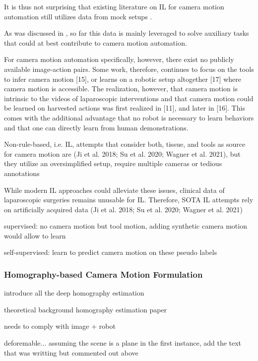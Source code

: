 It is thus not surprising that existing literature on IL for camera motion automation still utilizes data from mock setups \cite{ji2018learning,wagner2021learning}.

As was discussed in , so far this data is mainly leveraged to solve auxiliary tasks that could at best contribute to camera motion automation. 

For camera motion automation specifically, however, there exist no publicly available
image-action pairs. Some work, therefore, continues to focus on the tools to infer
camera motion [15], or learns on a robotic setup altogether [17] where camera
motion is accessible. The realization, however, that camera motion is intrinsic to
the videos of laparoscopic interventions and that camera motion could be learned
on harvested actions was first realized in [11], and later in [16]. This comes with
the additional advantage that no robot is necessary to learn behaviors and that
one can directly learn from human demonstrations.

Non-rule-based, i.e. IL, attempts
that consider both, tissue, and tools as source for camera motion are (Ji et al. 2018;
Su et al. 2020; Wagner et al. 2021), but they utilize an oversimplified setup, require
multiple cameras or tedious annotations

While modern IL approaches could alleviate these issues, clinical
data of laparoscopic surgeries remains unusable for IL. Therefore, SOTA IL attempts
rely on artificially acquired data (Ji et al. 2018; Su et al. 2020; Wagner et al. 2021)





supervised: no camera motion but tool motion, adding synthetic camera motion would allow to learn

self-supervised: learn to predict camera motion on these pseudo labels

\subsubsection{Homography-based Camera Motion Formulation}
\label{in:sec:homography_based_camera_motion_formulation}

introduce all the deep homography estimation

theoretical background homography estimation paper

needs to comply with image + robot

deforemable... assuming the scene is a plane in the first instance, add the text that was writting but commented out above


